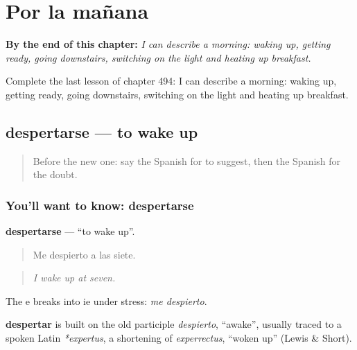 
\chapter{Por la mañana}
\label{ch:es-por-la-manana}

\begin{chapteropening}
\textbf{By the end of this chapter:} \emph{I can describe a morning: waking up, getting ready, going downstairs, switching on the light and heating up breakfast.}

Complete the last lesson of chapter 494: I can describe a morning: waking up, getting ready, going downstairs, switching on the light and heating up breakfast.
\end{chapteropening}

\section[despertarse]{despertarse — to wake up}

\label{lesson:ES-C494-despertarse}



\begin{quote}
Before the new one: say the Spanish for to suggest, then the Spanish for the doubt.
\end{quote}

\subsection*{You'll want to know: despertarse}
\textbf{despertarse} — \textquotedblleft{}to wake up\textquotedblright{}.

\begin{quote}
Me despierto a las siete.
\end{quote}

\begin{quote}
\emph{I wake up at seven.}
\end{quote}

The e breaks into ie under stress: \emph{me despierto}.

\begin{cousinweb}
\textbf{despertar} is built on the old participle \emph{despierto}, \textquotedblleft{}awake\textquotedblright{}, usually traced to a spoken Latin \emph{*expertus}, a shortening of \emph{experrectus}, \textquotedblleft{}woken up\textquotedblright{} (Lewis \& Short).
\end{cousinweb}

